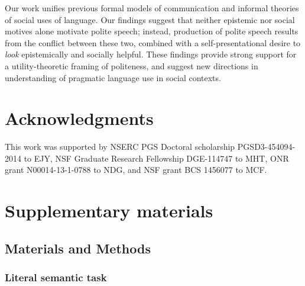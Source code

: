 \documentclass[12pt]{article}
\begin{document}
Our work unifies previous formal models of communication and informal
theories of social uses of language. Our findings suggest that neither
epistemic nor social motives alone motivate polite speech; instead,
production of polite speech results from the conflict between these two,
combined with a self-presentational desire to \emph{look} epistemically
and socially helpful. These findings provide strong support for a
utility-theoretic framing of politeness, and suggest new directions in
understanding of pragmatic language use in social contexts.











\section*{Acknowledgments}
This work was supported by NSERC PGS Doctoral scholarship PGSD3-454094-2014 to EJY, NSF Graduate Research Fellowship DGE-114747 to MHT, ONR grant N00014-13-1-0788 to NDG, and NSF grant BCS 1456077 to MCF.


\section*{Supplementary materials}

\subsection*{Materials and Methods}

\subsubsection*{Literal semantic task}
\end{document}
